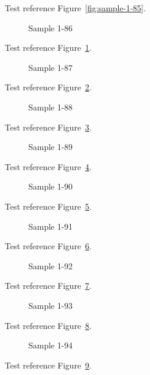 Test reference Figure~\ref{fig:sample-1-85}.

\begin{figure}[tbhp]
\caption{Sample 1-86}
\label{fig:sample-1-86}
\end{figure}

Test reference Figure~\ref{fig:sample-1-86}.

\begin{figure}[tbhp]
\caption{Sample 1-87}
\label{fig:sample-1-87}
\end{figure}

Test reference Figure~\ref{fig:sample-1-87}.

\begin{figure}[tbhp]
\caption{Sample 1-88}
\label{fig:sample-1-88}
\end{figure}

Test reference Figure~\ref{fig:sample-1-88}.

\begin{figure}[tbhp]
\caption{Sample 1-89}
\label{fig:sample-1-89}
\end{figure}

Test reference Figure~\ref{fig:sample-1-89}.

\begin{figure}[tbhp]
\caption{Sample 1-90}
\label{fig:sample-1-90}
\end{figure}

Test reference Figure~\ref{fig:sample-1-90}.

\begin{figure}[tbhp]
\caption{Sample 1-91}
\label{fig:sample-1-91}
\end{figure}

Test reference Figure~\ref{fig:sample-1-91}.

\begin{figure}[tbhp]
\caption{Sample 1-92}
\label{fig:sample-1-92}
\end{figure}

Test reference Figure~\ref{fig:sample-1-92}.

\begin{figure}[tbhp]
\caption{Sample 1-93}
\label{fig:sample-1-93}
\end{figure}

Test reference Figure~\ref{fig:sample-1-93}.

\begin{figure}[tbhp]
\caption{Sample 1-94}
\label{fig:sample-1-94}
\end{figure}

Test reference Figure~\ref{fig:sample-1-94}.

